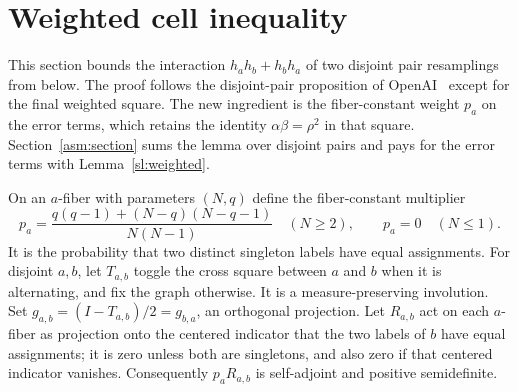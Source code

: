 \section{Weighted cell inequality}\label{cell:section}
This section bounds the interaction $h_ah_b+h_bh_a$ of two disjoint pair
resamplings from below. The proof follows the disjoint-pair proposition of
OpenAI~\cite[Proposition~5.1]{OAI26} except for the final weighted square.
The new ingredient is the fiber-constant weight $p_a$ on the error terms,
which retains the identity $\alpha\beta=\rho^2$ in that square. Section~\ref{asm:section} sums the lemma over disjoint pairs
and pays for the error terms with Lemma~\ref{sl:weighted}.

On an $a$-fiber with parameters $(N,q)$ define the fiber-constant multiplier
\begin{equation}\label{cell:p}
 p_a=\frac{q(q-1)+(N-q)(N-q-1)}{N(N-1)}\quad(N\ge2),
 \qquad p_a=0\quad(N\le1).
\end{equation}
It is the probability that two distinct singleton labels have equal
assignments. For disjoint $a,b$, let $T_{a,b}$ toggle the cross square
between $a$ and $b$ when it is alternating, and fix the graph otherwise. It is
a measure-preserving involution. Set $g_{a,b}=(I-T_{a,b})/2=g_{b,a}$, an
orthogonal projection. Let $R_{a,b}$ act on each $a$-fiber as projection onto
the centered indicator that the two labels of $b$ have equal assignments; it
is zero unless both are singletons, and also zero if that centered indicator
vanishes. Consequently $p_aR_{a,b}$ is self-adjoint and positive
semidefinite.

